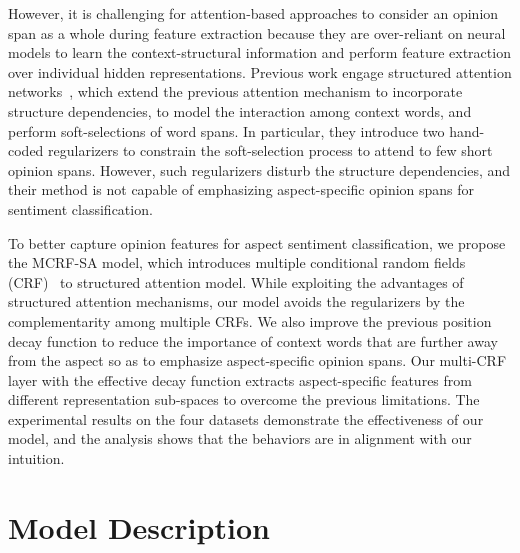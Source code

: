 \documentclass[11pt,a4paper]{article}
\begin{document}
However,  it is challenging for attention-based approaches to consider an opinion span as a whole during feature extraction because they are over-reliant on neural models to learn the context-structural information and perform feature extraction over individual hidden representations.
Previous work \cite{bailin-lu:2018:AAAI2018}  engage structured attention networks~\cite{Kim2017StructuredAN}, which extend the previous attention mechanism to incorporate structure dependencies, to model the interaction among context words, and perform soft-selections of word spans.
In particular, they introduce two hand-coded regularizers to constrain the soft-selection process to attend to few short opinion spans. However, such regularizers disturb the structure dependencies, and their method is not capable of emphasizing aspect-specific opinion spans for sentiment classification.















To better capture opinion features for aspect sentiment classification, we propose the MCRF-SA model, which introduces multiple conditional random fields (CRF)~\cite{Lafferty:2001:CRF} to structured attention model.
While exploiting the advantages of structured attention mechanisms, our model avoids the regularizers by the complementarity among multiple CRFs. We also improve the previous position decay function \cite{lixin2018P18-1087, Tang:ACL2019}  to reduce the importance of context words that are further away from the aspect so as to emphasize aspect-specific opinion spans.
Our multi-CRF layer with the effective decay function extracts  aspect-specific features from different representation sub-spaces to overcome the previous limitations. The experimental results on the four datasets demonstrate the effectiveness of our model, and the analysis shows that the behaviors are in alignment with our intuition.









\section{Model Description}
\end{document}
